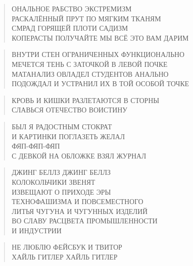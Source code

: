 \poemtitle{***}
\begin{verse}
ОНАЛЬНОЕ РАБСТВО ЭКСТРЕМИЗМ\\
РАСКАЛЁННЫЙ ПРУТ ПО МЯГКИМ ТКАНЯМ\\
СМРАД ГОРЯЩЕЙ ПЛОТИ САДИЗМ\\
КОПЕРАСТЫ ПОЛУЧАЙТЕ МЫ ВСЁ ЭТО ВАМ ДАРИМ
\end{verse}

\poemtitle{***}
\begin{verse}
ВНУТРИ СТЕН ОГРАНИЧЕННЫХ ФУНКЦИОНАЛЬНО\\
МЕЧЕТСЯ ТЕНЬ С ЗАТОЧКОЙ В ЛЕВОЙ ПОЧКЕ\\
МАТАНАЛИЗ ОВЛАДЕЛ СТУДЕНТОВ АНАЛЬНО\\
ПОДОЖДАЛ И УСТРАНИЛ ИХ В ТОЙ ОСОБОЙ ТОЧКЕ
\end{verse}

\poemtitle{***}
\begin{verse}
КРОВЬ И КИШКИ РАЗЛЕТАЮТСЯ В СТОРНЫ\\
СЛАВЬСЯ ОТЕЧЕСТВО ВОИСТИНУ
\end{verse}

\poemtitle{***}
\begin{verse}
БЫЛ Я РАДОСТНЫМ СТОКРАТ\\
И КАРТИНКИ ПОГЛАЗЕТЬ ЖЕЛАЛ\\
ФЯП-ФЯП-ФЯП\\
С ДЕВКОЙ НА ОБЛОЖКЕ ВЗЯЛ ЖУРНАЛ
\end{verse}

\poemtitle{***}
\begin{verse}
ДЖИНГ БЕЛЛЗ ДЖИНГ БЕЛЛЗ\\
КОЛОКОЛЬЧИКИ ЗВЕНЯТ\\
ИЗВЕЩАЮТ О ПРИХОДЕ ЭРЫ\\
ТЕХНОФАШИЗМА И ПОВСЕМЕСТНОГО\\
ЛИТЬЯ ЧУГУНА И ЧУГУННЫХ ИЗДЕЛИЙ\\
ВО СЛАВУ РАСЦВЕТА ПРОМЫШЛЕННОСТИ\\
И ИНДУСТРИИ
\end{verse}

\poemtitle{***}
\begin{verse}
НЕ ЛЮБЛЮ ФЕЙСБУК И ТВИТОР\\
ХАЙЛЬ ГИТЛЕР ХАЙЛЬ ГИТЛЕР
\end{verse}

